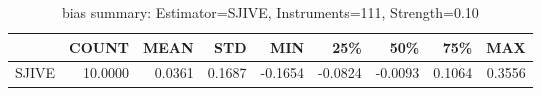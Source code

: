 \begin{table}[ht]
\centering
\caption{bias summary: Estimator=SJIVE, Instruments=111, Strength=0.10}
\begin{tabular}{lrrrrrrrr}
\toprule
 & COUNT & MEAN & STD & MIN & 25\% & 50\% & 75\% & MAX \\
\midrule
SJIVE & 10.0000 & 0.0361 & 0.1687 & -0.1654 & -0.0824 & -0.0093 & 0.1064 & 0.3556 \\
\bottomrule
\end{tabular}
\end{table}
